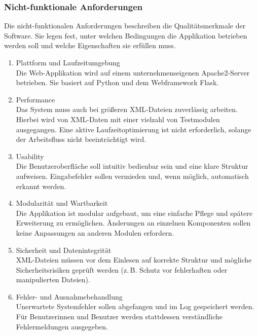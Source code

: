 \subsubsection{Nicht-funktionale Anforderungen}
\label{subsec:nicht-funktionale-anforderungen}

Die nicht-funktionalen Anforderungen beschreiben die Qualitätsmerkmale der Software.
Sie legen fest, unter welchen Bedingungen die Applikation betrieben werden soll und welche Eigenschaften sie erfüllen muss.

\begin{enumerate}
  \item Plattform und Laufzeitumgebung \\
  Die Web-Applikation wird auf einem unternehmenseigenen Apache2-Server betrieben.
  Sie basiert auf Python und dem Webframework Flask.

  \item Performance \\
  Das System muss auch bei größeren XML-Dateien zuverlässig arbeiten.
  Hierbei wird von XML-Daten mit einer vielzahl von Testmodulen ausgegangen.
  Eine aktive Laufzeitoptimierung ist nicht erforderlich, solange der Arbeitsfluss nicht beeinträchtigt wird.

  \item Usability \\
  Die Benutzeroberfläche soll intuitiv bedienbar sein und eine klare Struktur aufweisen.
  Eingabefehler sollen vermieden und, wenn möglich, automatisch erkannt werden.

  \item Modularität und Wartbarkeit \\
  Die Applikation ist modular aufgebaut, um eine einfache Pflege und spätere Erweiterung zu ermöglichen.
  Änderungen an einzelnen Komponenten sollen keine Anpassungen an anderen Modulen erfordern.

  \item Sicherheit und Datenintegrität \\
  XML-Dateien müssen vor dem Einlesen auf korrekte Struktur und mögliche Sicherheitsrisiken geprüft werden
  (z.\,B. Schutz vor fehlerhaften oder manipulierten Dateien).

  \item Fehler- und Ausnahmebehandlung \\
  Unerwartete Systemfehler sollen abgefangen und im Log gespeichert werden.
  Für Benutzerinnen und Benutzer werden stattdessen verständliche Fehlermeldungen ausgegeben.


\end{enumerate}
